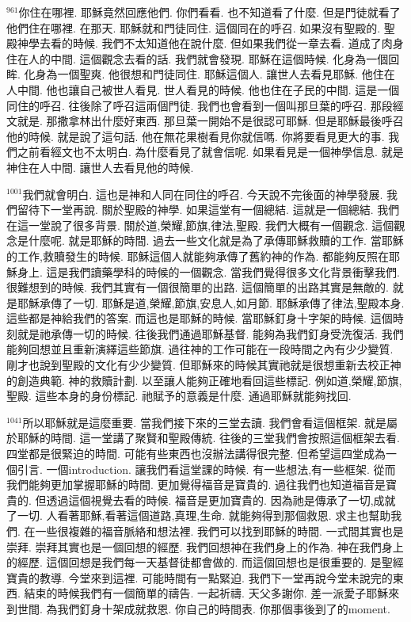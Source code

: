 \documentclass{book}
\begin{document}
$^{961}$你住在哪裡.
耶穌竟然回應他們.
你們看看.
也不知道看了什麼.
但是門徒就看了他們住在哪裡.
在那天.
耶穌就和門徒同住.
這個同在的呼召.
如果沒有聖殿的.
聖殿神學去看的時候.
我們不太知道他在說什麼.
但如果我們從一章去看.
道成了肉身住在人的中間.
這個觀念去看的話.
我們就會發現.
耶穌在這個時候.
化身為一個回眸.
化身為一個聖爽.
他很想和門徒同住.
耶穌這個人.
讓世人去看見耶穌.
他住在人中間.
他也讓自己被世人看見.
世人看見的時候.
他也住在子民的中間.
這是一個同住的呼召.
往後除了呼召這兩個門徒.
我們也會看到一個叫那旦葉的呼召.
那段經文就是.
那撒拿林出什麼好東西.
那旦葉一開始不是很認可耶穌.
但是耶穌最後呼召他的時候.
就是說了這句話.
他在無花果樹看見你就信嗎.
你將要看見更大的事.
我們之前看經文也不太明白.
為什麼看見了就會信呢.
如果看見是一個神學信息.
就是神住在人中間.
讓世人去看見他的時候.

$^{1001}$我們就會明白.
這也是神和人同在同住的呼召.
今天說不完後面的神學發展.
我們留待下一堂再說.
關於聖殿的神學.
如果這堂有一個總結.
這就是一個總結.
我們在這一堂說了很多背景.
關於道,榮耀,節旗,律法,聖殿.
我們大概有一個觀念.
這個觀念是什麼呢.
就是耶穌的時間.
過去一些文化就是為了承傳耶穌救贖的工作.
當耶穌的工作,救贖發生的時候.
耶穌這個人就能夠承傳了舊約神的作為.
都能夠反照在耶穌身上.
這是我們讀藥學科的時候的一個觀念.
當我們覺得很多文化背景衝擊我們.
很難想到的時候.
我們其實有一個很簡單的出路.
這個簡單的出路其實是無敵的.
就是耶穌承傳了一切.
耶穌是道,榮耀,節旗,安息人,如月節.
耶穌承傳了律法,聖殿本身.
這些都是神給我們的答案.
而這也是耶穌的時候.
當耶穌釘身十字架的時候.
這個時刻就是祂承傳一切的時候.
往後我們通過耶穌基督.
能夠為我們釘身受洗復活.
我們能夠回想並且重新演繹這些節旗.
過往神的工作可能在一段時間之內有少少變質.
剛才也說到聖殿的文化有少少變質.
但耶穌來的時候其實祂就是很想重新去校正神的創造典範.
神的救贖計劃.
以至讓人能夠正確地看回這些標記.
例如道,榮耀,節旗,聖殿.
這些本身的身份標記.
祂賦予的意義是什麼.
通過耶穌就能夠找回.

$^{1041}$所以耶穌就是這麼重要.
當我們接下來的三堂去讀.
我們會看這個框架.
就是屬於耶穌的時間.
這一堂講了聚賢和聖殿傳統.
往後的三堂我們會按照這個框架去看.
四堂都是很緊迫的時間.
可能有些東西也沒辦法講得很完整.
但希望這四堂成為一個引言.
一個introduction.
讓我們看這堂課的時候.
有一些想法,有一些框架.
從而我們能夠更加掌握耶穌的時間.
更加覺得福音是寶貴的.
過往我們也知道福音是寶貴的.
但透過這個視覺去看的時候.
福音是更加寶貴的.
因為祂是傳承了一切,成就了一切.
人看著耶穌,看著這個道路,真理,生命.
就能夠得到那個救恩.
求主也幫助我們.
在一些很複雜的福音脈絡和想法裡.
我們可以找到耶穌的時間.
一式間其實也是崇拜.
崇拜其實也是一個回想的經歷.
我們回想神在我們身上的作為.
神在我們身上的經歷.
這個回想是我們每一天基督徒都會做的.
而這個回想也是很重要的.
是聖經寶貴的教導.
今堂來到這裡.
可能時間有一點緊迫.
我們下一堂再說今堂未說完的東西.
結束的時候我們有一個簡單的禱告.
一起祈禱.
天父多謝你.
差一派愛子耶穌來到世間.
為我們釘身十架成就救恩.
你自己的時間表.
你那個事後到了的moment.
\end{document}

